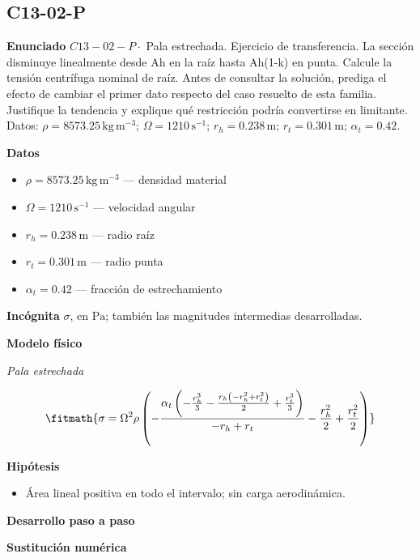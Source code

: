 \documentclass[10pt,openany]{book}
\begin{document}
\subsection*{C13-02-P}

\noindent\textbf{Enunciado}
\(C13-02-P \cdot\) Pala estrechada. Ejercicio de transferencia. La sección disminuye linealmente desde Ah en la raíz hasta Ah(1-k) en punta. Calcule la tensión centrífuga nominal de raíz. Antes de consultar la solución, prediga el efecto de cambiar el primer dato respecto del caso resuelto de esta familia. Justifique la tendencia y explique qué restricción podría convertirse en limitante. Datos: \(\rho=8573.25\, \mathrm{kg}\,\mathrm{m}^{-3}\); \(\Omega=1210\, \mathrm{s}^{-1}\); \(r_h=0.238\, \mathrm{m}\); \(r_t=0.301\, \mathrm{m}\); \(\alpha_t=0.42\).

\noindent\textbf{Datos}
\begin{itemize}
\item $\rho = 8573.25\,\mathrm{kg}\,\mathrm{m}^{-3}$ — densidad material
\item $\Omega = 1210\,\mathrm{s}^{-1}$ — velocidad angular
\item $r_h = 0.238\,\mathrm{m}$ — radio raíz
\item $r_t = 0.301\,\mathrm{m}$ — radio punta
\item $\alpha_t = 0.42$ — fracción de estrechamiento
\end{itemize}

\noindent\textbf{Incógnita}
$\sigma$, en $\mathrm{Pa}$; también las magnitudes intermedias desarrolladas.

\noindent\textbf{Modelo físico}

\noindent\textit{Pala estrechada}

\[
\fitmath{\sigma=\Omega^{2} \rho \left(- \frac{\alpha_t \left(- \frac{r_h^{3}}{3} - \frac{r_h \left(- r_h^{2} + r_t^{2}\right)}{2} + \frac{r_t^{3}}{3}\right)}{- r_h + r_t} - \frac{r_h^{2}}{2} + \frac{r_t^{2}}{2}\right)}
\]

\noindent\textbf{Hipótesis}
\begin{itemize}
\item Área lineal positiva en todo el intervalo; sin carga aerodinámica.
\end{itemize}

\noindent\textbf{Desarrollo paso a paso}



\noindent\textbf{Sustitución numérica}
\end{document}
